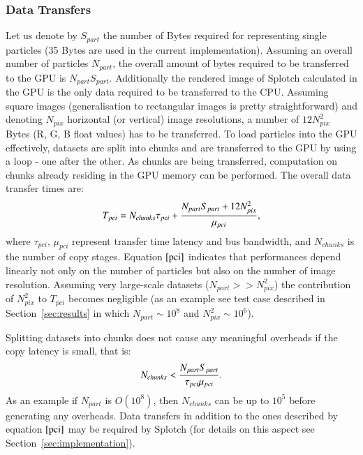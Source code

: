 \documentclass[1p]{elsarticle}
\begin{document}


\subsubsection{Data Transfers}
Let us denote by $S_{part}$ the number of Bytes required for representing single particles (35 Bytes are used in the current implementation). Assuming an overall number of particles $N_{part}$, the overall amount of bytes required to be transferred to the GPU is $N_{part} S_{part}$. Additionally the rendered image of Splotch calculated in the GPU is the only data required to be transferred to the CPU. Assuming square images (generalisation to rectangular images is pretty straightforward) and denoting $N_{pix}$ horizontal (or vertical) image resolutions, a number of $12 N_{pix}^2$ Bytes (R, G, B float values) has to be transferred. To load particles into the GPU effectively, datasets are split into chunks and are transferred to the GPU by using a loop - one after the other. As chunks are being transferred, computation on chunks already residing in the GPU memory can be performed. The overall data transfer times are:
\begin{equation}\label{pci}
T_{pci} =  N_{chunks} \tau_{pci} + {N_{part} S_{part} + 12 N_{pix}^2 \over 
\mu_{pci}},
\end{equation}
where $\tau_{pci}$, $\mu_{pci}$ represent transfer time latency and bus bandwidth, and $N_{chunks}$ is the number of copy stages. Equation $\eqref{pci}$ indicates that performances depend linearly not only on the number of particles but also on the number of image resolution. Assuming very large-scale datasets ($N_{part} >> N_{pix}^2$) the contribution of $N_{pix}^2$ to $T_{pci}$ becomes negligible (as an example see test case described in Section~\ref{sec:results} in which $N_{part} \sim 10^8$
and $N_{pix}^2 \sim 10^6$).

Splitting datasets into chunks does not cause any meaningful overheads if the copy latency is small, that is:
\begin{equation}
N_{chunks} < {N_{part} S_{part}\over \tau_{pci}\mu_{pci}}.
\end{equation}
As an example if $N_{part}$ is $O(10^8)$, then $N_{chunks}$ can be up to $10^5$ before
generating any overheads. Data transfers in addition to the ones described by equation $\eqref{pci}$ may be required by Splotch (for details on this aspect see Section~\ref{sec:implementation}).
\end{document}
